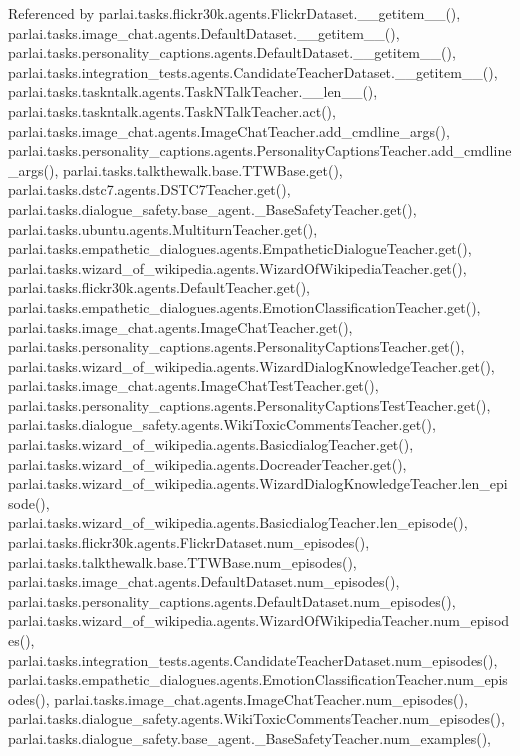Referenced by parlai.\+tasks.\+flickr30k.\+agents.\+Flickr\+Dataset.\+\_\+\+\_\+getitem\+\_\+\+\_\+(), parlai.\+tasks.\+image\+\_\+chat.\+agents.\+Default\+Dataset.\+\_\+\+\_\+getitem\+\_\+\+\_\+(), parlai.\+tasks.\+personality\+\_\+captions.\+agents.\+Default\+Dataset.\+\_\+\+\_\+getitem\+\_\+\+\_\+(), parlai.\+tasks.\+integration\+\_\+tests.\+agents.\+Candidate\+Teacher\+Dataset.\+\_\+\+\_\+getitem\+\_\+\+\_\+(), parlai.\+tasks.\+taskntalk.\+agents.\+Task\+N\+Talk\+Teacher.\+\_\+\+\_\+len\+\_\+\+\_\+(), parlai.\+tasks.\+taskntalk.\+agents.\+Task\+N\+Talk\+Teacher.\+act(), parlai.\+tasks.\+image\+\_\+chat.\+agents.\+Image\+Chat\+Teacher.\+add\+\_\+cmdline\+\_\+args(), parlai.\+tasks.\+personality\+\_\+captions.\+agents.\+Personality\+Captions\+Teacher.\+add\+\_\+cmdline\+\_\+args(), parlai.\+tasks.\+talkthewalk.\+base.\+T\+T\+W\+Base.\+get(), parlai.\+tasks.\+dstc7.\+agents.\+D\+S\+T\+C7\+Teacher.\+get(), parlai.\+tasks.\+dialogue\+\_\+safety.\+base\+\_\+agent.\+\_\+\+Base\+Safety\+Teacher.\+get(), parlai.\+tasks.\+ubuntu.\+agents.\+Multiturn\+Teacher.\+get(), parlai.\+tasks.\+empathetic\+\_\+dialogues.\+agents.\+Empathetic\+Dialogue\+Teacher.\+get(), parlai.\+tasks.\+wizard\+\_\+of\+\_\+wikipedia.\+agents.\+Wizard\+Of\+Wikipedia\+Teacher.\+get(), parlai.\+tasks.\+flickr30k.\+agents.\+Default\+Teacher.\+get(), parlai.\+tasks.\+empathetic\+\_\+dialogues.\+agents.\+Emotion\+Classification\+Teacher.\+get(), parlai.\+tasks.\+image\+\_\+chat.\+agents.\+Image\+Chat\+Teacher.\+get(), parlai.\+tasks.\+personality\+\_\+captions.\+agents.\+Personality\+Captions\+Teacher.\+get(), parlai.\+tasks.\+wizard\+\_\+of\+\_\+wikipedia.\+agents.\+Wizard\+Dialog\+Knowledge\+Teacher.\+get(), parlai.\+tasks.\+image\+\_\+chat.\+agents.\+Image\+Chat\+Test\+Teacher.\+get(), parlai.\+tasks.\+personality\+\_\+captions.\+agents.\+Personality\+Captions\+Test\+Teacher.\+get(), parlai.\+tasks.\+dialogue\+\_\+safety.\+agents.\+Wiki\+Toxic\+Comments\+Teacher.\+get(), parlai.\+tasks.\+wizard\+\_\+of\+\_\+wikipedia.\+agents.\+Basicdialog\+Teacher.\+get(), parlai.\+tasks.\+wizard\+\_\+of\+\_\+wikipedia.\+agents.\+Docreader\+Teacher.\+get(), parlai.\+tasks.\+wizard\+\_\+of\+\_\+wikipedia.\+agents.\+Wizard\+Dialog\+Knowledge\+Teacher.\+len\+\_\+episode(), parlai.\+tasks.\+wizard\+\_\+of\+\_\+wikipedia.\+agents.\+Basicdialog\+Teacher.\+len\+\_\+episode(), parlai.\+tasks.\+flickr30k.\+agents.\+Flickr\+Dataset.\+num\+\_\+episodes(), parlai.\+tasks.\+talkthewalk.\+base.\+T\+T\+W\+Base.\+num\+\_\+episodes(), parlai.\+tasks.\+image\+\_\+chat.\+agents.\+Default\+Dataset.\+num\+\_\+episodes(), parlai.\+tasks.\+personality\+\_\+captions.\+agents.\+Default\+Dataset.\+num\+\_\+episodes(), parlai.\+tasks.\+wizard\+\_\+of\+\_\+wikipedia.\+agents.\+Wizard\+Of\+Wikipedia\+Teacher.\+num\+\_\+episodes(), parlai.\+tasks.\+integration\+\_\+tests.\+agents.\+Candidate\+Teacher\+Dataset.\+num\+\_\+episodes(), parlai.\+tasks.\+empathetic\+\_\+dialogues.\+agents.\+Emotion\+Classification\+Teacher.\+num\+\_\+episodes(), parlai.\+tasks.\+image\+\_\+chat.\+agents.\+Image\+Chat\+Teacher.\+num\+\_\+episodes(), parlai.\+tasks.\+dialogue\+\_\+safety.\+agents.\+Wiki\+Toxic\+Comments\+Teacher.\+num\+\_\+episodes(), parlai.\+tasks.\+dialogue\+\_\+safety.\+base\+\_\+agent.\+\_\+\+Base\+Safety\+Teacher.\+num\+\_\+examples(), 